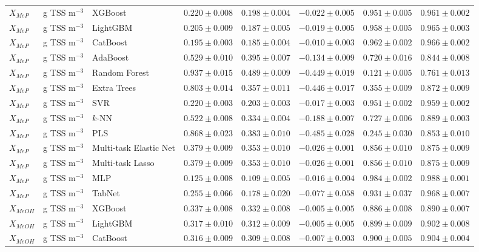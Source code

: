 \begin{longtable}{llp{3.1cm}rrrrr}
$X_{MeP}$ & g TSS m$^{-3}$ & XGBoost & $0.220\pm0.008$ & $0.198\pm0.004$ & $-0.022\pm0.005$ & $0.951\pm0.005$ & $0.961\pm0.002$ \\
$X_{MeP}$ & g TSS m$^{-3}$ & LightGBM & $0.205\pm0.009$ & $0.187\pm0.005$ & $-0.019\pm0.005$ & $0.958\pm0.005$ & $0.965\pm0.003$ \\
$X_{MeP}$ & g TSS m$^{-3}$ & CatBoost & $0.195\pm0.003$ & $0.185\pm0.004$ & $-0.010\pm0.003$ & $0.962\pm0.002$ & $0.966\pm0.002$ \\
$X_{MeP}$ & g TSS m$^{-3}$ & AdaBoost & $0.529\pm0.010$ & $0.395\pm0.007$ & $-0.134\pm0.009$ & $0.720\pm0.016$ & $0.844\pm0.008$ \\
$X_{MeP}$ & g TSS m$^{-3}$ & Random Forest & $0.937\pm0.015$ & $0.489\pm0.009$ & $-0.449\pm0.019$ & $0.121\pm0.005$ & $0.761\pm0.013$ \\
$X_{MeP}$ & g TSS m$^{-3}$ & Extra Trees & $0.803\pm0.014$ & $0.357\pm0.011$ & $-0.446\pm0.017$ & $0.355\pm0.009$ & $0.872\pm0.009$ \\
$X_{MeP}$ & g TSS m$^{-3}$ & SVR & $0.220\pm0.003$ & $0.203\pm0.003$ & $-0.017\pm0.003$ & $0.951\pm0.002$ & $0.959\pm0.002$ \\
$X_{MeP}$ & g TSS m$^{-3}$ & $k$-NN & $0.522\pm0.008$ & $0.334\pm0.004$ & $-0.188\pm0.007$ & $0.727\pm0.006$ & $0.889\pm0.003$ \\
$X_{MeP}$ & g TSS m$^{-3}$ & PLS & $0.868\pm0.023$ & $0.383\pm0.010$ & $-0.485\pm0.028$ & $0.245\pm0.030$ & $0.853\pm0.010$ \\
$X_{MeP}$ & g TSS m$^{-3}$ & Multi-task Elastic Net & $0.379\pm0.009$ & $0.353\pm0.010$ & $-0.026\pm0.001$ & $0.856\pm0.010$ & $0.875\pm0.009$ \\
$X_{MeP}$ & g TSS m$^{-3}$ & Multi-task Lasso & $0.379\pm0.009$ & $0.353\pm0.010$ & $-0.026\pm0.001$ & $0.856\pm0.010$ & $0.875\pm0.009$ \\
$X_{MeP}$ & g TSS m$^{-3}$ & MLP & $0.125\pm0.008$ & $0.109\pm0.005$ & $-0.016\pm0.004$ & $0.984\pm0.002$ & $0.988\pm0.001$ \\
$X_{MeP}$ & g TSS m$^{-3}$ & TabNet & $0.255\pm0.066$ & $0.178\pm0.020$ & $-0.077\pm0.058$ & $0.931\pm0.037$ & $0.968\pm0.007$ \\
$X_{MeOH}$ & g TSS m$^{-3}$ & XGBoost & $0.337\pm0.008$ & $0.332\pm0.008$ & $-0.005\pm0.005$ & $0.886\pm0.008$ & $0.890\pm0.007$ \\
$X_{MeOH}$ & g TSS m$^{-3}$ & LightGBM & $0.317\pm0.010$ & $0.312\pm0.009$ & $-0.005\pm0.005$ & $0.899\pm0.009$ & $0.902\pm0.008$ \\
$X_{MeOH}$ & g TSS m$^{-3}$ & CatBoost & $0.316\pm0.009$ & $0.309\pm0.008$ & $-0.007\pm0.003$ & $0.900\pm0.005$ & $0.904\pm0.004$ \\

\end{longtable}
